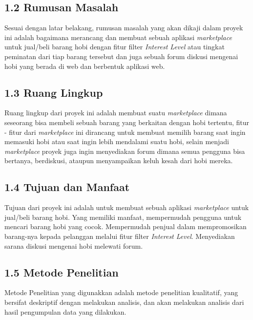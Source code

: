 \documentclass[a4paper]{article}
\begin{document}
\subsection*{1.2 Rumusan Masalah}

Sesuai dengan latar belakang, rumusan masalah yang akan dikaji dalam proyek ini adalah bagaimana merancang dan membuat sebuah aplikasi \textit{marketplace} untuk jual/beli barang hobi dengan fitur filter \textit{Interest Level} atau tingkat peminatan dari tiap barang tersebut dan juga sebuah forum diskusi mengenai hobi yang berada di web dan berbentuk aplikasi web.

\subsection*{1.3 Ruang Lingkup}
Ruang lingkup dari proyek ini adalah membuat suatu \textit{marketplace} dimana seseorang bisa membeli sebuah barang yang berkaitan dengan hobi tertentu, fitur - fitur dari \textit{marketplace} ini dirancang untuk membuat memilih barang saat ingin memasuki hobi atau saat ingin lebih mendalami suatu hobi, selain menjadi \textit{marketplace} proyek juga ingin menyediakan forum dimana semua pengguna bisa bertanya, berdiskusi, ataupun menyampaikan keluh kesah dari hobi mereka.

\subsection*{1.4 Tujuan dan Manfaat}

Tujuan dari proyek ini adalah untuk membuat sebuah aplikasi \textit{marketplace} untuk jual/beli barang hobi. Yang memiliki manfaat, mempermudah pengguna untuk mencari barang hobi yang cocok. Mempermudah penjual dalam mempromosikan barang-nya kepada pelanggan melalui fitur filter \textit{Interest Level}. Menyediakan sarana diskusi mengenai hobi melewati forum.

\subsection*{1.5 Metode Penelitian}

Metode Penelitian yang digunakkan adalah metode penelitian kualitatif, yang bersifat deskriptif dengan melakukan analisis\autocite{pengajar-kualitatif}, dan akan melakukan analisis dari hasil pengumpulan data yang dilakukan.
\end{document}
